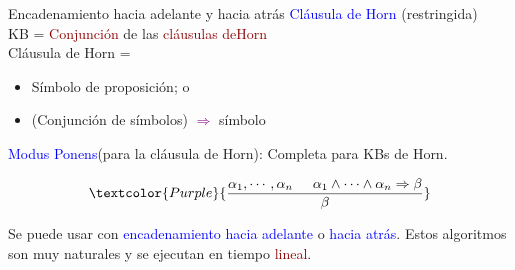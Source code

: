 
\begin{frame}{Encadenamiento hacia adelante y hacia atrás}
    \textcolor{blue}{Cláusula de Horn} (restringida)\\
    
    \hspace{0.5cm}KB = \textcolor{DarkRed}{Conjunción} de las
    \textcolor{DarkRed}{cláusulas deHorn}\\
    
    Cláusula de Horn =
    \begin{itemize}
        \item Símbolo de proposición; o
        \item (Conjunción de símbolos) \textcolor{Purple}{$\Rightarrow$} símbolo
    \end{itemize}{}
    \textcolor{blue}{Modus Ponens}(para la cláusula de Horn): Completa para KBs de
    Horn.
    
    \begin{equation*}
        \textcolor{Purple}{\frac{\alpha_1, \cdots, \alpha_n \hspace{0.5cm} \alpha_1
        \wedge \cdots \wedge \alpha_n \Rightarrow \beta}{\beta}}
    \end{equation*}{}
    
    Se puede usar con \textcolor{blue}{encadenamiento hacia adelante} o \textcolor{blue}{hacia atrás}.
    Estos algoritmos son muy naturales y se ejecutan en tiempo \textcolor{DarkRed}{lineal}.
\end{frame}{}
